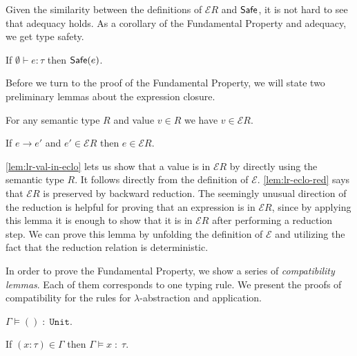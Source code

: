 Given the similarity between the definitions of $\mathcal{E}R$ and $\mathsf{Safe}$,
it is not hard to see that adequacy holds. As a corollary of the Fundamental
Property and adequacy, we get type safety.

\begin{theorem}
  If $\emptyset \vdash e : \tau$ then $\mathsf{Safe}(e)$.
\end{theorem}

Before we turn to the proof of the Fundamental Property, we will state
two preliminary lemmas about the expression closure.

\begin{lemma}\label{lem:lr-val-in-eclo}
  For any semantic type $R$ and value $v \in R$
  we have $v \in \mathcal{E}R$.
\end{lemma}

\begin{lemma}\label{lem:lr-eclo-red}
  If $e \longrightarrow e'$ and $e' \in \mathcal{E}R$ then $e \in \mathcal{E}R$.
\end{lemma}

\autoref{lem:lr-val-in-eclo} lets us show that a value is in $\mathcal{E} R$ by
directly using the semantic type $R$. It follows directly from the definition of
$\mathcal{E}$.
\autoref{lem:lr-eclo-red} says that $\mathcal{E} R$ is
preserved by backward reduction. The seemingly unusual direction of the
reduction is helpful for proving that an expression is in $\mathcal{E} R$,
since by applying this lemma it is enough to show that it is in $\mathcal{E} R$
after performing a reduction step.
We can prove this lemma by unfolding the definition of $\mathcal{E}$ and
utilizing the fact that the reduction relation is deterministic.

In order to prove the Fundamental Property,
we show a series of \emph{compatibility lemmas}.
Each of them corresponds to one typing rule.
We present the proofs of compatibility for the rules for $\lambda$-abstraction
and application.

\begin{lemma}
  $\Gamma \models () \;:\; \mathtt{Unit}$.
\end{lemma}

\begin{lemma}
  If $(x:\tau) \in \Gamma$ then
  $\Gamma \models x \;:\; \tau$.
\end{lemma}


